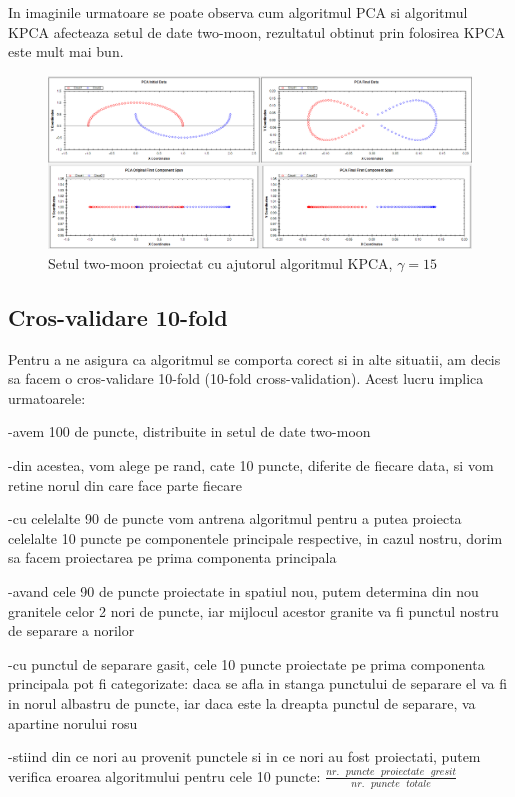 \documentclass[12pt,oneside]{article}
\begin{document}
In imaginile urmatoare se poate observa cum algoritmul PCA si algoritmul KPCA afecteaza setul de date two-moon, rezultatul obtinut prin folosirea KPCA este mult mai bun. 


\begin{figure}[H]
\centering
\caption{Setul two-moon proiectat cu ajutorul algoritmul KPCA, $\gamma =15$}
\includegraphics[width=\linewidth]{twomoon1}
\end{figure}

\subsection{Cros-validare 10-fold}
Pentru a ne asigura ca algoritmul se comporta corect si in alte situatii, am decis sa facem o cros-validare 10-fold (10-fold cross-validation). Acest lucru implica urmatoarele: 

-avem 100 de puncte, distribuite in setul de date two-moon

-din acestea, vom alege pe rand, cate 10 puncte, diferite de fiecare data, si vom retine norul din care face parte fiecare

-cu celelalte 90 de puncte vom antrena algoritmul pentru a putea proiecta celelalte 10 puncte pe componentele principale respective, in cazul nostru, dorim sa facem proiectarea pe prima componenta principala

-avand cele 90 de puncte proiectate in spatiul nou, putem determina din nou granitele celor 2 nori de puncte, iar mijlocul acestor granite va fi punctul nostru de separare a norilor

-cu punctul de separare gasit, cele 10 puncte proiectate pe prima componenta principala pot fi categorizate: daca se afla in stanga punctului de separare el va fi in norul albastru de puncte, iar daca este la dreapta punctul de separare, va apartine norului rosu

-stiind din ce nori au provenit punctele si in ce nori au fost proiectati, putem verifica eroarea algoritmului pentru cele 10 puncte: $\frac{nr. \text { } puncte \text { } proiectate \text { } gresit}{nr. \text { } puncte \text { } totale}$
\end{document}
